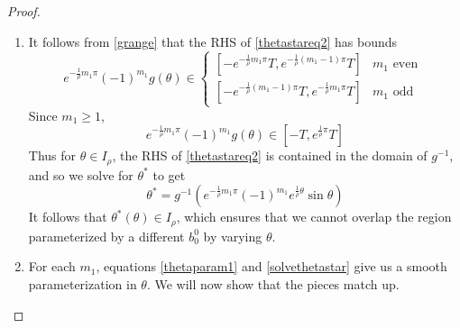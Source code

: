 \documentclass[thesis.tex]{subfiles}
\begin{document}
\begin{lemma}
\begin{proof}
\begin{enumerate}
	\item It follows from \eqref{grange} that the RHS of \eqref{thetastareq2} has bounds
	\begin{equation}\label{RHSbounds}
	e^{ -\frac{1}{\rho} m_1 \pi } (-1)^{m_1} g(\theta) \in
	\begin{cases}
	[-e^{-\frac{1}{\rho}m_1 \pi} T, e^{-\frac{1}{\rho}(m_1 - 1) \pi} T] & m_1 \text{ even }\\
	[-e^{-\frac{1}{\rho}(m_1 - 1) \pi} T, e^{-\frac{1}{\rho}m_1 \pi} T] & m_1 \text{ odd }
	\end{cases}
	\end{equation}
	Since $m_1 \geq 1$, 
	\begin{equation*}
	e^{ -\frac{1}{\rho} m_1 \pi } (-1)^{m_1} g(\theta) \in [-T, e^{\frac{1}{\rho}\pi} T]
	\end{equation*}
	Thus for $\theta \in I_\rho$, the RHS of \eqref{thetastareq2} is contained in the domain of $g^{-1}$, and so we solve for $\theta^*$ to get
	\begin{equation}\label{solvethetastar}
	\theta^* = g^{-1}\left( e^{ -\frac{1}{\rho} m_1 \pi } (-1)^{m_1}  e^{ \frac{1}{\rho} \theta } \sin \theta \right)
	\end{equation}
	It follows that $\theta^*(\theta) \in I_\rho$, which ensures that we cannot overlap the region parameterized by a different $b_0^0$ by varying $\theta$.

	\item For each $m_1$, equations \eqref{thetaparam1} and \eqref{solvethetastar} give us a smooth parameterization in $\theta$. We will now show that the pieces  match up. 


\end{enumerate}
\end{proof}
\end{lemma}
\end{document}
